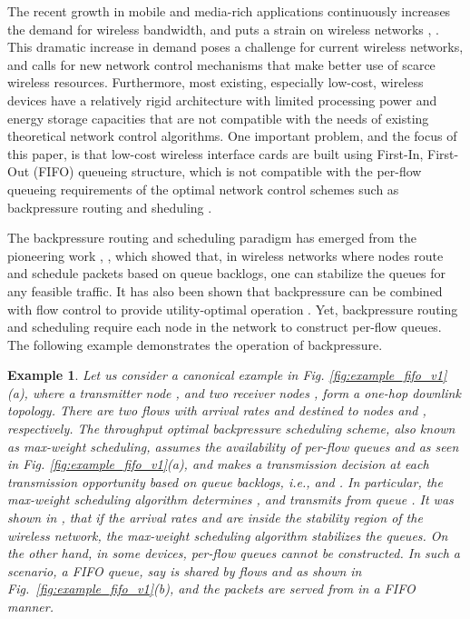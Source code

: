 \documentclass[conference]{IEEEtran}
\newcommand{\ie}{{\em i.e., }}
\newtheorem{example}{Example}
\begin{document}
The recent growth in mobile and media-rich applications continuously increases the demand for wireless bandwidth, and puts a strain on wireless networks \cite{cisco_index}, \cite{ericsson_report}. This dramatic increase in demand poses a challenge for current wireless networks, and calls for new network control mechanisms that make better use of scarce wireless resources. Furthermore, most existing, especially low-cost, wireless devices have a relatively rigid architecture with limited processing power and energy storage capacities that are not compatible with the needs of existing theoretical network control algorithms. One important problem, and the focus of this paper, is that low-cost wireless interface cards are built using First-In, First-Out (FIFO) queueing structure, which is not compatible with the per-flow queueing requirements of the optimal network control schemes such as backpressure routing and sheduling \cite{tass_eph1}.


The backpressure routing and scheduling paradigm has emerged from the pioneering work \cite{tass_eph1}, \cite{tass_eph2}, which showed that, in wireless networks where nodes route and schedule packets based on queue backlogs, one can stabilize the queues for any feasible traffic. It has also been shown that backpressure can be combined with flow control to provide utility-optimal operation \cite{neely_mod}. Yet, backpressure routing and scheduling require each node in the network to construct per-flow queues. The following example demonstrates the operation of backpressure. 

\begin{example}
Let us consider a canonical example in Fig. \ref{fig:example_fifo_v1}(a), where a transmitter node , and two receiver nodes ,  form a one-hop downlink topology. There are two flows with arrival rates  and  destined to nodes  and , respectively. The throughput optimal backpressure scheduling scheme, also known as max-weight scheduling, assumes the availability of
per-flow queues  and  as seen in Fig. \ref{fig:example_fifo_v1}(a), and 
makes a transmission decision at each transmission opportunity based on queue backlogs, \ie  and . In particular, the max-weight scheduling algorithm determines , and transmits from queue . It was shown in \cite{tass_eph1}, \cite{tass_eph2} that if the arrival rates  and  are inside the stability region of the wireless network, the max-weight scheduling algorithm stabilizes the queues. On the other hand, in some devices, per-flow queues cannot be constructed. In such a scenario, a FIFO queue, say  is shared by flows  and  as shown in Fig.~\ref{fig:example_fifo_v1}(b), and the packets are served from  in a FIFO manner.
\hfill 
\end{example}
\end{document}
